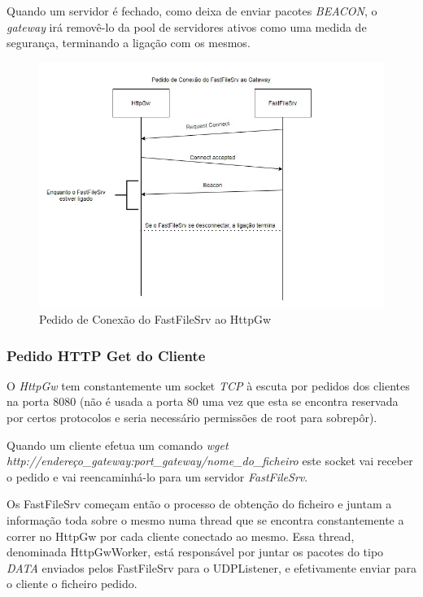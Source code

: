 \documentclass[11pt]{article}
\begin{document}
\par Quando um servidor é fechado, como deixa de enviar pacotes \textit{BEACON}, o \textit{gateway} irá removê-lo da pool de servidores ativos como uma medida de segurança, terminando a ligação com os mesmos.

\begin{figure}[!ht]
    \centering
    \includegraphics[scale=0.8]{images/RequestUDPconnection.jpg}
    \caption{Pedido de Conexão do FastFileSrv ao HttpGw}
    \label{fig:connect}
\end{figure}

\subsubsection{Pedido HTTP Get do Cliente}

\par O \textit{HttpGw} tem constantemente um socket \textit{TCP} à escuta por pedidos dos clientes na porta 8080 (não é usada a porta 80 uma vez que esta se encontra reservada por certos protocolos e seria necessário permissões de root para sobrepôr).\\

\par Quando um cliente efetua um comando \textit{wget http://endereço\_gateway:port\_gateway/nome\_do\_ficheiro} este socket vai receber o pedido e vai reencaminhá-lo para um servidor \textit{FastFileSrv}.\\

\par Os FastFileSrv começam então o processo de obtenção do ficheiro e juntam a informação toda sobre o mesmo numa thread que se encontra constantemente a correr no HttpGw por cada cliente conectado ao mesmo. Essa thread, denominada HttpGwWorker, está responsável por juntar os pacotes do tipo \textit{DATA} enviados pelos FastFileSrv para o UDPListener, e efetivamente enviar para o cliente o ficheiro pedido.\\
\end{document}
